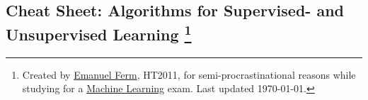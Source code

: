 \documentclass[landscape,a2paper,8pt]{article}
\begin{document}
\ifpdf
{}
\else
{}
\fi
%
%
%
%
\begin{center}
\section*{\sc \LARGE Cheat Sheet: Algorithms for Supervised- and Unsupervised Learning \footnote{Created by \href{http://eferm.com}{Emanuel Ferm}, HT2011, for semi-procrastinational reasons while studying for a \href{http://www.comlab.ox.ac.uk/teaching/courses/2010-2011/machinelearning/}{Machine Learning} exam. Last updated \today.}}
\end{center}
\end{document}
